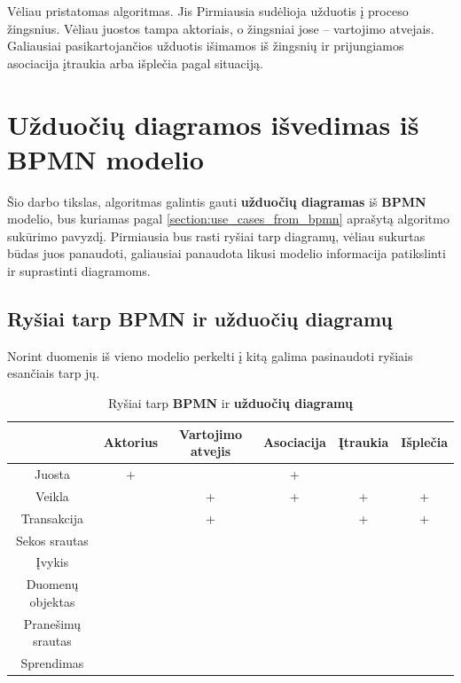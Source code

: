 \documentclass{VUMIFInfBakalaurinis}
\begin{document}
Vėliau pristatomas algoritmas. Jis Pirmiausia sudėlioja užduotis į proceso žingsnius. Vėliau juostos tampa aktoriais, o žingsniai jose – vartojimo atvejais. Galiausiai pasikartojančios užduotis išimamos iš žingsnių ir prijungiamos asociacija įtraukia arba išplečia pagal situaciją.

\section{\textbf{Užduočių diagramos} išvedimas iš \textbf{BPMN} modelio}

Šio darbo tikslas, algoritmas galintis gauti \textbf{užduočių diagramas} iš \textbf{BPMN} modelio, bus kuriamas pagal \ref{section:use_cases_from_bpmn} aprašytą algoritmo sukūrimo pavyzdį. Pirmiausia bus rasti ryšiai tarp diagramų, vėliau sukurtas būdas juos panaudoti, galiausiai panaudota likusi modelio informacija patikslinti ir suprastinti diagramoms.

\subsection{Ryšiai tarp \textbf{BPMN} ir \textbf{užduočių diagramų}} \label{section:relations_sd_bpmn}

Norint duomenis iš vieno modelio perkelti į kitą galima pasinaudoti ryšiais esančiais tarp jų.

\begin{center}
    \begin{longtable}{ | c | c |  c | c | c | c |}
    \caption{Ryšiai tarp \textbf{BPMN} ir \textbf{užduočių diagramų}}
	\label{tab:relations_sd_bpmn}
    \\ \hline 
     & 
     Aktorius 
     & 
     Vartojimo atvejis 
     & 
     Asociacija 
     & 
     Įtraukia 
     & 
     Išplečia 
     \\ 
    \hline 
    Juosta & + & & + &  &  \\
    \hline
    Veikla  & & + & + & + & + \\
    \hline
    Transakcija & & + & & + & + \\
    \hline
    Sekos srautas  & &  & & & \\
    \hline
    Įvykis  & & & & & \\
    \hline 
    Duomenų objektas  & & & & & \\
    \hline
    Pranešimų srautas  & & & & & \\
    \hline
    Sprendimas  & & & & & \\
    \hline
    \end{longtable}
\end{center} 
\end{document}
